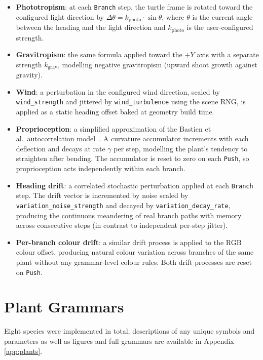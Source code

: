 \begin{itemize}
\item \textbf{Phototropism}: at each \texttt{Branch} step, the turtle frame is rotated toward the configured
  light direction by $\Delta\theta = k_\text{photo} \cdot \sin\theta$, where $\theta$ is the current angle
  between the heading and the light direction and $k_\text{photo}$ is the user-configured strength.
\item \textbf{Gravitropism}: the same formula applied toward the $+Y$ axis with a separate strength
  $k_\text{grav}$, modelling negative gravitropism (upward shoot growth against gravity).
\item \textbf{Wind}: a perturbation in the configured wind direction, scaled by \texttt{wind\_strength} and
  jittered by \texttt{wind\_turbulence} using the scene RNG, is applied as a static heading offset baked at
  geometry build time.
\item \textbf{Proprioception}: a simplified approximation of the Bastien et al.\ autocorrelation
  model~\cite{bastienUnifiedModelShoot2015}. A curvature accumulator increments with each deflection and
  decays at rate $\gamma$ per step, modelling the plant's tendency to straighten after bending. The
  accumulator is reset to zero on each \texttt{Push}, so proprioception acts independently within each
  branch.
\item \textbf{Heading drift}: a correlated stochastic perturbation applied at each \texttt{Branch} step. The
  drift vector is incremented by noise scaled by \texttt{variation\_noise\_strength} and decayed by
  \texttt{variation\_decay\_rate}, producing the continuous meandering of real branch paths with memory
  across consecutive steps (in contrast to independent per-step jitter).
\item \textbf{Per-branch colour drift}: a similar drift process is applied to the RGB colour offset, producing
  natural colour variation across branches of the same plant without any grammar-level colour rules. Both
  drift processes are reset on \texttt{Push}.
\end{itemize}

\section{Plant Grammars}
\label{sec:grammars}

Eight species were implemented in total, descriptions of any unique symbols and parameters as well as figures
and full grammars are available in Appendix \ref{app:plants}.

